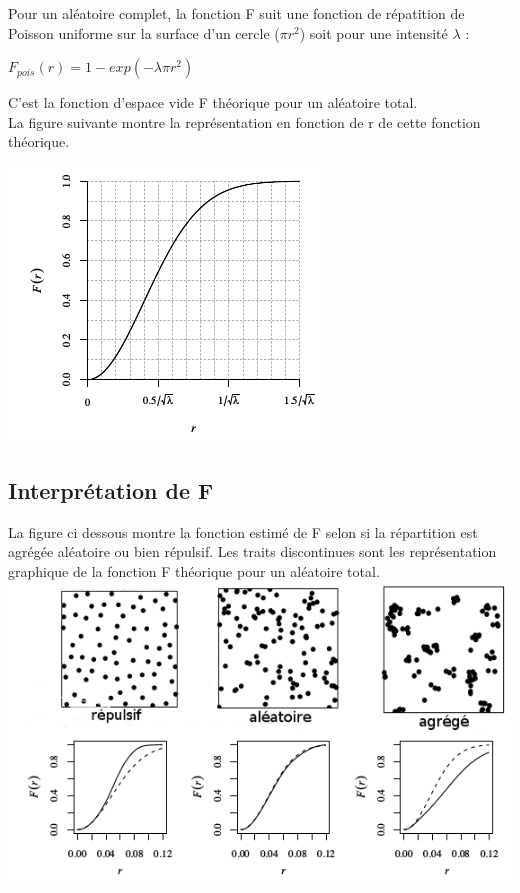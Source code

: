 \documentclass[french,12pt,a4paper]{report}
\begin{document}
\begin{minipage}{0.5\linewidth}
\indent
Pour un aléatoire complet, la fonction F suit une fonction de répatition de Poisson uniforme sur la surface d'un cercle (\begin{math} \pi r^2 \end{math}) soit pour une intensité \begin{math} \lambda \end{math} : 
\begin{center}\begin{math} F_{pois}(r) = 1 - exp(-\lambda \pi r^2) \end{math}\end{center}
C'est la fonction d'espace vide F théorique pour un aléatoire total.\\
\indent
La figure suivante montre la représentation en fonction de r de cette fonction théorique.
\end{minipage}\hfill
\begin{minipage}{0.5\linewidth}
\includegraphics[scale=0.7]{images/poisson.png}
\end{minipage}


\subsection{Interprétation de F}
La figure ci dessous montre la fonction estimé de F selon si la répartition est agrégée aléatoire ou bien répulsif. Les traits discontinues sont les représentation graphique de la fonction F théorique pour un aléatoire total.\\

\includegraphics[scale=0.7]{images/interpret.png}
\end{document}
